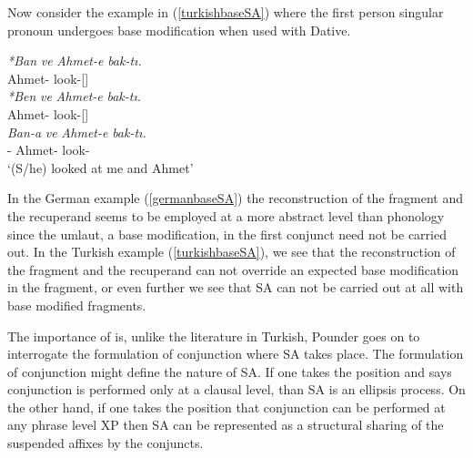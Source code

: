Now consider the example in (\ref{turkishbaseSA}) where the first person singular pronoun undergoes base modification when used with Dative.

\begin{exe}
    \ex \label{turkishbaseSA}
    \begin{xlist}
        \ex
        \gll
        \textit{*Ban} \textit{ve} \textit{Ahmet-e} \textit{bak-tı.} \\ {\First}{\Sg} {\And} Ahmet-{\Dat} look-{\Pst}[{\Third}{\Sg}] \\
    
        \ex 
        \gll
        \textit{*Ben} \textit{ve} \textit{Ahmet-e} \textit{bak-tı.} \\ {\First}{\Sg} {\And} Ahmet-{\Dat} look-{\Pst}[{\Third}{\Sg}] \\
        
        \ex \gll 
        \textit{Ban-a} \textit{ve} \textit{Ahmet-e} \textit{bak-tı.} \\ {\First}{\Sg}-{\Dat} {\And} Ahmet-{\Dat} look-{\Pst}\\
        \glt `(S/he) looked at me and Ahmet'
    \end{xlist}
\end{exe}

In the German example (\ref{germanbaseSA}) the reconstruction of the fragment and the recuperand seems to be employed at a more abstract level than phonology since the umlaut, a base modification, in the first conjunct need not be carried out. In the Turkish example (\ref{turkishbaseSA}), we see that the reconstruction of the fragment and the recuperand can not override an expected base modification in the fragment, or even further we see that SA can not be carried out at all with base modified fragments.

The importance of \cite{pounder2006broken} is, unlike the literature in Turkish, Pounder goes on to interrogate the formulation of conjunction where SA takes place. The formulation of conjunction might define the nature of SA. If one takes the position and says conjunction is performed only at a clausal level, than SA is an ellipsis process. On the other hand, if one takes the position that conjunction can be performed at any phrase level XP then SA can be represented as a structural sharing of the suspended affixes by the conjuncts.
































